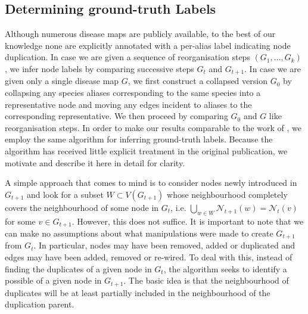 \documentclass[
	fontsize=10pt, %
	twoside=false, %
	secnumdepth=1, %
  toc=indentunnumbered %
]{kaobook}
\begin{document}
\subsection{Determining ground-truth Labels}
Although numerous disease maps are publicly available, to the best of our
knowledge none are explicitly annotated with a per-alias label indicating node
duplication. In case we are given a sequence of reorganisation steps $(G_1, ...,
G_k)$ , we infer node labels by comparing successive steps $G_t$ and $G_{t+1}$.
In
case we are given only a single disease map $G$, we first construct a collapsed
version $G_0$ by collapsing any species aliases
corresponding to the same species into a representative node and moving any edges
incident to aliases to the corresponding representative. We then proceed by
comparing $G_0$ and $G$ like reorganisation steps.
%
In order to make our results comparable to the work of
\citeauthor{nielsen_MachineLearningSupport_2019}
\cite{nielsen_MachineLearningSupport_2019}, we employ the same algorithm for
inferring ground-truth labels. Because the algorithm has received little
explicit treatment in the original publication, we motivate and describe it here
in detail for clarity.
%

A simple approach that comes to mind is to consider nodes newly introduced in
$G_{t+1}$ and look for a subset $W \subset V(G_{t+1})$ whose neighbourhood
completely covers the neighbourhood of some node in $G_{t}$, i.e. $\bigcup_{w
  \in W} \mathcal{N}_{t+1}(w) = \mathcal{N}_t(v)$ for some $v \in G_{t+1}$.
However, this does not suffice. It is important to note that we can make no
assumptions about what manipulations were made to create $G_{t+1}$ from $G_t$.
In particular, nodes may have been removed, added or duplicated and edges may
have been added, removed or re-wired.
%
To deal with this, instead of finding the duplicates of a given node in
$G_{t}$, the algorithm seeks to identify a possible  of
a given node in $G_{t+1}$. The basic idea is that the neighbourhood of
duplicates will be at least partially included in the neighbourhood of the
duplication parent.
\end{document}
